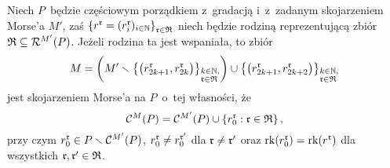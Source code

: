 \begin{lem}\label{lem-wspaniali_reprezentanci_sa_odwracalni}
Niech $P$~będzie częściowym porządkiem z~gradacją i~z~zadanym skojarzeniem Morse'a $M'$, zaś $\left\{r^{\mathfrak{r}}=(r^{\mathfrak{r}}_i)_{i\in\mathbb{N}}\right\}_{\mathfrak{r}\in\mathfrak{R}}$ niech będzie rodziną reprezentującą zbiór $\mathfrak{R}\subseteq \mathcal{R}^{M'}(P)$. Jeżeli rodzina ta jest wspaniała, to zbiór
\[M=\left(M'\smallsetminus \left\{\left(r^{\mathfrak{r}}_{2k+1}, r^{\mathfrak{r}}_{2k}\right)\right\}_{\begin{subarray}{l}k\in\mathbb{N},\\ \mathfrak{r}\in\mathfrak{R}\end{subarray}}\right) \cup \left\{\left(r^{\mathfrak{r}}_{2k+1}, r^{\mathfrak{r}}_{2k+2}\right)\right\}_{\begin{subarray}{l}k\in\mathbb{N},\\ \mathfrak{r}\in\mathfrak{R}\end{subarray}}\]
jest skojarzeniem Morse'a na $P$~o~tej własności, że 
\[\mathcal{C}^{M}(P)=\mathcal{C}^{M'}(P)\cup \left\{r^{\mathfrak{r}}_0:\mathfrak{r}\in\mathfrak{R}\right\},\] przy czym $r^{\mathfrak{r}}_0\in P\smallsetminus \mathcal{C}^{M'}(P)$, $r^{\mathfrak{r}}_0\not=r^{\mathfrak{r}'}_0$ dla $\mathfrak{r}\not=\mathfrak{r}'$ oraz $\operatorname{rk}(r_0^{\mathfrak{r}})=\operatorname{rk}(r^{\mathfrak{r}})$ dla wszystkich $\mathfrak{r},\mathfrak{r}'\in\mathfrak{R}$. 
\end{lem}
